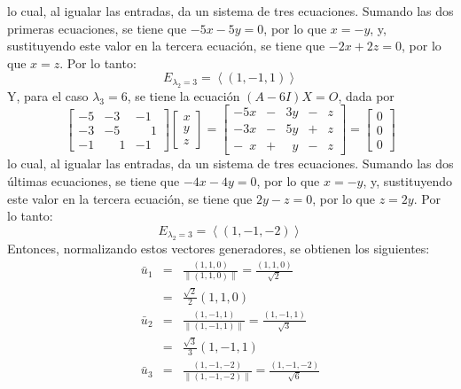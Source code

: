 \begin{solucion}
 lo cual, al igualar las entradas, da un sistema de tres ecuaciones. Sumando las dos primeras ecuaciones, se tiene que $-5x-5y = 0$, por lo que $x=-y$, y, sustituyendo este valor en la tercera ecuaci\'on, se tiene que $-2x+2z = 0$, por lo que $x=z$. Por lo tanto:
 \begin{equation*}
  E_{\lambda_2 = 3} = \left< (1,-1,1) \right>
 \end{equation*}
 Y, para  el caso  $\lambda_3 = 6$, se tiene la ecuaci\'on $(A-6I)X = O$, dada por
 \begin{equation*}
  \begin{bmatrix}
   -5 & -3 & -1 \\
   -3 & -5 & \phantom{-}1 \\
   -1 & \phantom{-}1 & -1
  \end{bmatrix}
  \begin{bmatrix}
   x \\ y \\ z 
  \end{bmatrix}
  =
  \begin{bmatrix}
   -5x & - & 3y & - & z \\
   -3x & - & 5y & + & z \\
   -\phantom{3}x & + & \phantom{3}y & - & z
  \end{bmatrix}
  =
  \begin{bmatrix}
   0 \\ 0 \\ 0
  \end{bmatrix}
 \end{equation*}
 lo cual, al igualar las entradas, da un sistema de tres ecuaciones. Sumando las dos \'ultimas ecuaciones, se tiene que $-4x-4y = 0$, por lo que $x=-y$, y, sustituyendo este valor en la tercera ecuaci\'on, se tiene que $2y-z = 0$, por lo que $z=2y$. Por lo tanto:
 \begin{equation*}
  E_{\lambda_2 = 3} = \left< (1,-1,-2) \right>
 \end{equation*}
 Entonces, normalizando estos vectores generadores, se obtienen los siguientes:
 \begin{eqnarray*}
  \bar{u}_1 & = & \frac{(1,1,0)}{\lVert (1,1,0) \rVert} = \frac{(1,1,0)}{\sqrt{2}} \\
  & = & \frac{\sqrt{2}}{2}(1,1,0)\\
  \bar{u}_2 & = & \frac{(1,-1,1)}{\lVert (1,-1,1) \rVert} = \frac{(1,-1,1)}{\sqrt{3}} \\ 
  & = & \frac{\sqrt{3}}{3}(1,-1,1) \\
  \bar{u}_3 & = & \frac{(1,-1,-2)}{\lVert (1,-1,-2) \rVert} = \frac{(1,-1,-2)}{\sqrt{6}} \\

\end{eqnarray*}
\end{solucion}
